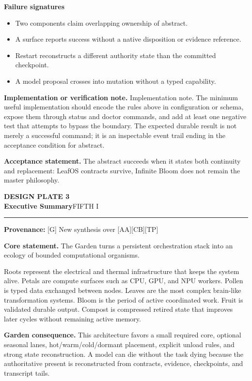 \documentclass[10pt,letterpaper,oneside]{article}
\newcommand{\prov}[1]{\textcolor{gardenBlue}{\sffamily\footnotesize\textbf{Provenance:} #1}}
\newcommand{\platetitle}[3]{%
  \begin{minipage}[t][0.54in][t]{\textwidth}
  {\sffamily\bfseries\color{gardenDeep}\fontsize{9}{10}\selectfont DESIGN PLATE #1}\\[-1pt]
  {\sffamily\bfseries\color{gardenInk}\fontsize{16.5}{18}\selectfont #2}\hfill{\sffamily\color{gardenGreen}\large #3}
  \end{minipage}\vspace{-2pt}\hrule\vspace{5pt}}
\begin{document}
\textbf{Failure signatures}
\begin{itemize}
\item Two components claim overlapping ownership of abstract.
\item A surface reports success without a native disposition or evidence reference.
\item Restart reconstructs a different authority state than the committed checkpoint.
\item A model proposal crosses into mutation without a typed capability.
\end{itemize}
\textbf{Implementation or verification note.} Implementation note. The minimum useful implementation should encode the rules above in configuration or schema, expose them through status and doctor commands, and add at least one negative test that attempts to bypass the boundary. The expected durable result is not merely a successful command; it is an inspectable event trail ending in the acceptance condition for abstract.

\begin{acceptbox}
\textbf{Acceptance statement.} The abstract succeeds when it states both continuity and replacement: LeafOS contracts survive, Infinite Bloom does not remain the master philosophy.
\end{acceptbox}
\newpage
\platetitle{3}{Executive Summary}{FIFTH I}
\prov{[G] New synthesis over [AA][CB][TP]}
\fontsize{8.85}{10.45}\selectfont
\begin{corebox}
\textbf{Core statement.} The Garden turns a persistent orchestration stack into an ecology of bounded computational organisms.
\end{corebox}
Roots represent the electrical and thermal infrastructure that keeps the system alive. Petals are compute surfaces such as CPU, GPU, and NPU workers. Pollen is typed data exchanged between nodes. Leaves are the most complex brain-like transformation systems. Bloom is the period of active coordinated work. Fruit is validated durable output. Compost is compressed retired state that improves later cycles without remaining active memory.

\textbf{Garden consequence.} This architecture favors a small required core, optional seasonal lanes, hot/warm/cold/dormant placement, explicit unload rules, and strong state reconstruction. A model can die without the task dying because the authoritative present is reconstructed from contracts, evidence, checkpoints, and transcript tails.
\end{document}

